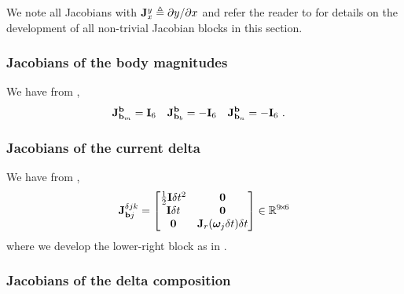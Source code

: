 \newcommand{\jac}[2]{{\bfJ^{#1}_{#2}}}

We note all Jacobians with $\jac{y}{x}\te\dparil{y}{x}$ and refer the reader to  for details on the development of all non-trivial Jacobian blocks in this section.



\subsubsection{Jacobians of the body magnitudes}

We have from ,
%
\begin{align}\label{equ:jac_body}
\jac{\bfb}{\bfb_m}&=\bfI_6 & \jac{\bfb}{\bfb_b}&=-\bfI_6 & \jac{\bfb}{\bfb_n}&=-\bfI_6
~.
\end{align}

\subsubsection{Jacobians of the current delta}
\label{sec:jac_data}

We have from ,
%
\begin{align}\label{equ:jac_current_delta}
\jac{\delta jk}{\bfb j} =
\begin{bmatrix}
\frac12\bfI\dt^2 	& \bf0 \\
\bfI\dt 			& \bf0 \\
\bf0 	          & \bfJ_r(\bw_j\dt)\dt
\end{bmatrix} 
\in \bbR^{9\tcross6}
\end{align}
%
where we develop the lower-right block as in .





\subsubsection{Jacobians of the delta composition}

